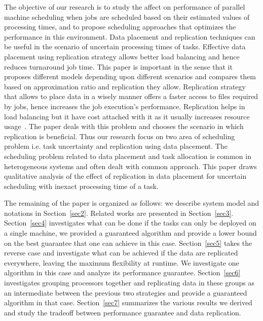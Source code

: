 \documentclass[10pt, conference, compsocconf]{IEEEtran}
\begin{document}
The objective of our research is to study the affect on performance of
parallel machine scheduling when jobs are scheduled based on their
estimated values of processing times, and to propose scheduling
approaches that optimizes the performance in this environment. Data
placement and replication techniques can be useful in the scenario of
uncertain processing times of tasks. Effective data placement using
replication strategy allows better load balancing and hence reduces
turnaround job time. This paper is important in the sense that it
proposes different models depending upon different scenarios and
compares them based on approximation ratio and replication they
allow. Replication strategy that allows to place data in a wisely
manner offers a faster access to files required by jobs, hence
increases the job execution's performance. Replication helps in load
balancing but it have cost attached with it as it usually increases
resource usage~\cite{DBLP:journals/corr/WangJW14}. The paper deals
with this problem and chooses the scenario in which replication is
beneficial. Thus our research focus on two area of scheduling problem
i.e. task uncertainty and replication using data placement. The
scheduling problem related to data placement and task allocation is
common in heterogeneous systems and often dealt with common
approach. This paper draws qualitative analysis of the effect of
replication in data placement for uncertain scheduling with inexact
processing time of a task.

The remaining of the paper is organized as follows: we describe system
model and notations in Section~\ref{sec2}. Related works are presented
in Section~\ref{sec3}.  Section~\ref{sec4} investigates what can be
done if the tasks can only be deployed on a single machine, we
provided a guaranteed algorithm and provide a lower bound on the best
guarantee that one can achieve in this case. Section~\ref{sec5} takes
the reverse case and investigate what can be achieved if the data are
replicated everywhere, leaving the maximum flexibility at runtime. We
investigate one algorithm in this case and analyze its performance
guarantee. Section~\ref{sec6} investigates grouping processors
together and replicating data in these groups as an intermediate
between the previous two strategies and provide a guaranteed algorithm
in that case. Section~\ref{sec7} summarizes the various results we
derived and study the tradeoff between performance guarantee and data
replication.
\end{document}
